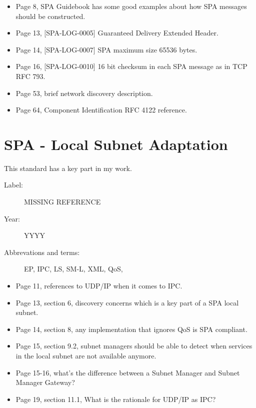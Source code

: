 \begin{itemize}
    \item Page 8, SPA Guidebook has some good examples about how SPA messages
        should be constructed.
    \item Page 13, [SPA-LOG-0005] Guaranteed Delivery Extended Header.
    \item Page 14, [SPA-LOG-0007] SPA maximum size 65536 bytes.
    \item Page 16, [SPA-LOG-0010] 16 bit checksum in each SPA message as in TCP
        RFC 793.
    \item Page 53, brief network discovery description.
    \item Page 64, Component Identification RFC 4122 reference.
\end{itemize}

\section{SPA - Local Subnet Adaptation}

This standard has a key part in my work.

\begin{description}
    \item[Label:] MISSING REFERENCE %
    \item[Year:] YYYY
    \item[Abbrevations and terms:]
        EP,
        IPC,
        LS,
        SM-L,
        XML,
        QoS,
\end{description}

\begin{itemize}
    \item Page 11, references to UDP/IP when it comes to IPC.
    \item Page 13, section 6, discovery concerns which is a key part of a SPA
        local subnet.
    \item Page 14, section 8, any implementation that ignores QoS is SPA
        compliant.
    \item Page 15, section 9.2, subnet managers should be able to detect when
        services in the local subnet are not available anymore.
    \item Page 15-16, what's the difference between a Subnet Manager and Subnet
        Manager Gateway?
    \item Page 19, section 11.1, What is the rationale for UDP/IP as IPC?
\end{itemize}

